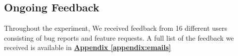 \subsection{Ongoing Feedback}
\par Throughout the experiment, We received feedback from 16 different users consisting of bug reports and feature requests. A full list of the feedback we received is available in \textbf{\hyperref[appendix:emails]{Appendix \ref*{appendix:emails}}}

